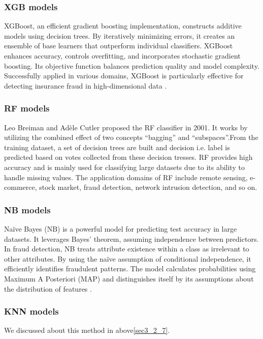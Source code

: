 \documentclass[preprint,12pt]{elsarticle}
\begin{document}
\subsubsection{XGB models}
\label{sec3_4_3}
XGBoost, an efficient gradient boosting implementation, constructs additive models using decision trees. By iteratively minimizing errors, it creates an ensemble of base learners that outperform individual classifiers. XGBoost enhances accuracy, controls overfitting, and incorporates stochastic gradient boosting. Its objective function balances prediction quality and model complexity. Successfully applied in various domains, XGBoost is particularly effective for detecting insurance fraud in high-dimensional data . 

\subsubsection{RF models}
\label{sec3_4_4}
Leo Breiman and Adèle Cutler proposed the RF classifier in 2001. It works by utilizing the combined effect of two concepts “bagging” and “subspaces”.From the training dataset, a set of decision trees are built and decision i.e. label is predicted based on votes collected from these decision tresses. RF provides high accuracy and is mainly used for classifying large datasets due to its ability to handle missing values. The application domains of RF include remote sensing, e-commerce, stock market, fraud detection, network intrusion detection, and so on.

\subsubsection{NB models}
\label{sec3_4_5}
Naïve Bayes (NB) is a powerful model for predicting test accuracy in large datasets. It leverages Bayes’ theorem, assuming independence between predictors. In fraud detection, NB treats attribute existence within a class as irrelevant to other attributes. By using the naïve assumption of conditional independence, it efficiently identifies fraudulent patterns. The model calculates probabilities using Maximum A Posteriori (MAP) and distinguishes itself by its assumptions about the distribution of features .

\subsubsection{KNN models}
\label{sec3_4_6}
We discussed about this method in above\ref{sec3_2_7}.
\end{document}
